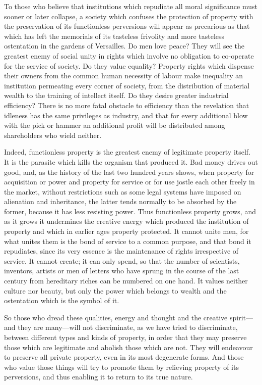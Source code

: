 \documentclass{book}
\begin{document}
To those who believe that institutions which repudiate all moral significance must sooner or later collapse, a society which confuses the protection of property with the preservation of its functionless perversions will appear as precarious as that which has left the memorials of its tasteless frivolity and more tasteless ostentation in the gardens of Versailles. Do men love peace? They will see the greatest enemy of social unity in rights which involve no obligation to co-operate for the service of society. Do they value equality? Property rights which dispense their owners from the common human necessity of labour make inequality an institution permeating every corner of society, from the distribution of material wealth to the training of intellect itself. Do they desire greater industrial efficiency? There is no more fatal obstacle to efficiency than the revelation that idleness has the same privileges as industry, and that for every additional blow with the pick or hammer an additional profit will be distributed among shareholders who wield neither.

Indeed, functionless property is the greatest enemy of legitimate property itself. It is the parasite which kills the organism that produced it. Bad money drives out good, and, as the history of the last two hundred years shows, when property for acquisition or power and property for service or for use jostle each other freely in the market, without restrictions such as some legal systems have imposed on alienation and inheritance, the latter tends normally to be absorbed by the former, because it has less resisting power. Thus functionless property grows, and as it grows it undermines the creative energy which produced the institution of property and which in earlier ages property protected. It cannot unite men, for what unites them is the bond of service to a common purpose, and that bond it repudiates, since its very essence is the maintenance of rights irrespective of service. It cannot create; it can only spend, so that the number of scientists, inventors, artists or men of letters who have sprung in the course of the last century from hereditary riches can be numbered on one hand. It values neither culture nor beauty, but only the power which belongs to wealth and the ostentation which is the symbol of it.

So those who dread these qualities, energy and thought and the creative spirit—and they are many—will not discriminate, as we have tried to discriminate, between different types and kinds of property, in order that they may preserve those which are legitimate and abolish those which are not. They will endeavour to preserve all private property, even in its most degenerate forms. And those who value those things will try to promote them by relieving property of its perversions, and thus enabling it to return to its true nature.
\end{document}
